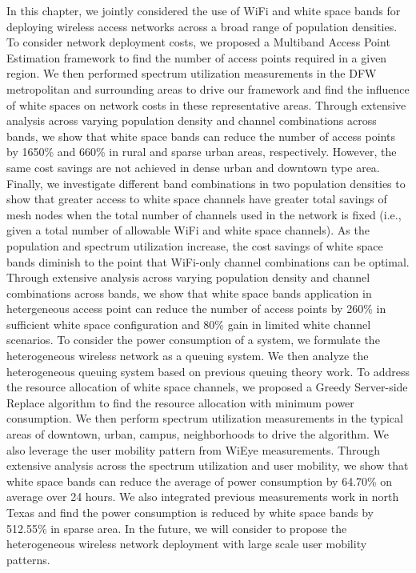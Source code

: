 In this chapter, we jointly considered the use of WiFi and white space bands for 
deploying wireless access networks across a broad range of population densities.
To consider network deployment costs, we proposed a Multiband Access Point Estimation 
framework to find the number of access points required in a given region.
We then performed spectrum utilization measurements in the DFW metropolitan 
and surrounding areas to drive our framework and find the influence of white spaces on
network costs in these representative areas. Through 
extensive analysis across varying population density and channel combinations across bands, 
we show that white space bands can reduce the number of access points by 1650\%
and 660\% in rural and sparse urban areas, respectively. However, the same cost savings
are not achieved in dense urban and downtown type area. Finally, we investigate different 
band combinations in two population densities to show that greater access to white space 
channels have greater total savings of mesh nodes when the total number of channels used 
in the network is fixed (i.e., given a total number of allowable WiFi and white space channels). 
As the population and spectrum utilization increase, the cost savings of white space bands
diminish to the point that WiFi-only channel combinations can be optimal.
Through extensive analysis across varying population density and channel combinations 
across bands, we show that white space bands application in hetergeneous access point 
can reduce the number of access points by 260\% in sufficient white space configuration
and 80\% gain in limited white channel scenarios.
To consider the power consumption of a system, we 
formulate the heterogeneous wireless network as a queuing system. 
We then analyze the heterogeneous queuing system based on previous queuing 
theory work. To address the resource allocation of white space channels, 
we proposed a Greedy Server-side Replace algorithm to find the resource allocation 
with minimum power consumption. We then perform spectrum utilization 
measurements in the typical areas of downtown, urban, campus, neighborhoods 
to drive the algorithm. We also leverage the user mobility pattern from WiEye 
measurements. Through extensive analysis across the spectrum utilization 
and user mobility, we show that white space bands can reduce the average of 
power consumption by 64.70\% on average over 24 hours. We also integrated previous 
measurements work in north Texas and find the power consumption is reduced by white space
bands by 512.55\% in sparse area.
In the future, we will consider to propose the heterogeneous wireless network 
deployment with large scale user mobility patterns.



